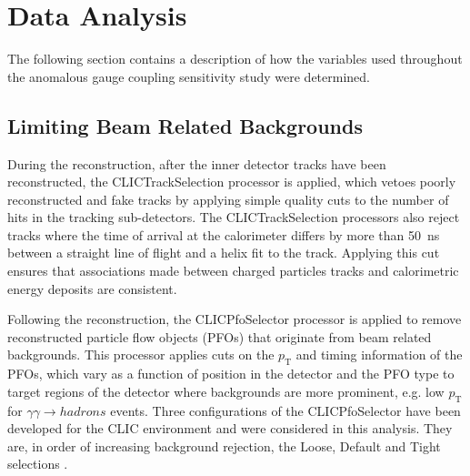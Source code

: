 
\section{Data Analysis}
\label{sec:dataanalysis}
The following section contains a description of how the variables used throughout the anomalous gauge coupling sensitivity study were determined.


\subsection{Limiting Beam Related Backgrounds} 
During the reconstruction, after the inner detector tracks have been reconstructed, the CLICTrackSelection processor \cite{arXiv:1209.4039} is applied, which vetoes poorly reconstructed and fake tracks by applying simple quality cuts to the number of hits in the tracking sub-detectors.  The CLICTrackSelection processors also reject tracks where the time of arrival at the calorimeter differs by more than 50~ns between a straight line of flight and a helix fit to the track.  Applying this cut ensures that associations made between charged particles tracks and calorimetric energy deposits are consistent.  

Following the reconstruction, the CLICPfoSelector processor \cite{arXiv:1209.4039} is applied to remove reconstructed particle flow objects (PFOs) that originate from beam related backgrounds.  This processor applies cuts on the $p_{\text{T}}$ and timing information of the PFOs, which vary as a function of position in the detector and the PFO type to target regions of the detector where backgrounds are more prominent, e.g. low $p_{\text{T}}$ for $\gamma\gamma \rightarrow hadrons$ events.  Three configurations of the CLICPfoSelector  have been developed for the CLIC environment and were considered in this analysis.  They are, in order of increasing background rejection, the Loose, Default and Tight selections \cite{arXiv:1209.4039}. 


